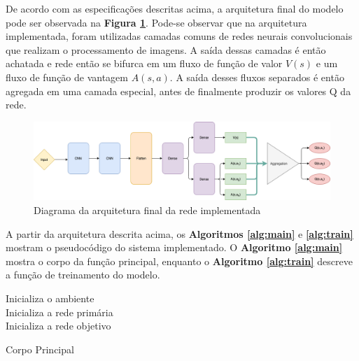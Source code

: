 De acordo com as especificações descritas acima, a arquitetura final do modelo pode ser observada na \textbf{Figura \ref{fig:diagrama_rede}}. Pode-se observar que na arquitetura implementada, foram utilizadas camadas comuns de redes neurais convolucionais que realizam o processamento de imagens. A saída dessas camadas é então achatada e rede então se bifurca em um fluxo de função de valor $V(s)$ e um fluxo de função de vantagem $A(s,a)$. A saída desses fluxos separados é então agregada em uma camada especial, antes de finalmente produzir os valores Q da rede.

\begin{figure}[h]
  \centering
  \includegraphics[width=1 \textwidth]{conteudo/imgs/diagrama_rede.png}
  \caption[Diagrama da arquitetura final da rede implementada]{Diagrama da arquitetura final da rede implementada}
  \label{fig:diagrama_rede}
\end{figure} 

A partir da arquitetura descrita acima, os \textbf{Algoritmos \ref{alg:main}} e \textbf{\ref{alg:train}} mostram o pseudocódigo do sistema implementado. O \textbf{Algoritmo \ref{alg:main}} mostra o corpo da função principal, enquanto o \textbf{Algoritmo \ref{alg:train}} descreve a função de treinamento do modelo.

\begin{algorithm}[H]
    \SetAlgoLined
    Inicializa o ambiente\\
    Inicializa a rede primária\\
    Inicializa a rede objetivo\\

   \caption{Corpo Principal}
   \label{alg:main}
  \end{algorithm}

